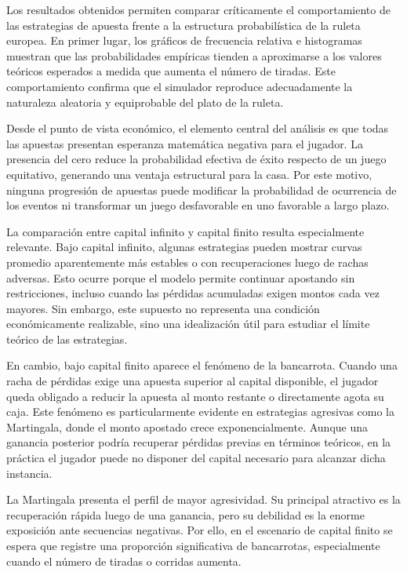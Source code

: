 \documentclass{article}
\begin{document}
Los resultados obtenidos permiten comparar críticamente el comportamiento de las estrategias de apuesta frente a la estructura probabilística de la ruleta europea. En primer lugar, los gráficos de frecuencia relativa e histogramas muestran que las probabilidades empíricas tienden a aproximarse a los valores teóricos esperados a medida que aumenta el número de tiradas. Este comportamiento confirma que el simulador reproduce adecuadamente la naturaleza aleatoria y equiprobable del plato de la ruleta.

Desde el punto de vista económico, el elemento central del análisis es que todas las apuestas presentan esperanza matemática negativa para el jugador. La presencia del cero reduce la probabilidad efectiva de éxito respecto de un juego equitativo, generando una ventaja estructural para la casa. Por este motivo, ninguna progresión de apuestas puede modificar la probabilidad de ocurrencia de los eventos ni transformar un juego desfavorable en uno favorable a largo plazo.

La comparación entre capital infinito y capital finito resulta especialmente relevante. Bajo capital infinito, algunas estrategias pueden mostrar curvas promedio aparentemente más estables o con recuperaciones luego de rachas adversas. Esto ocurre porque el modelo permite continuar apostando sin restricciones, incluso cuando las pérdidas acumuladas exigen montos cada vez mayores. Sin embargo, este supuesto no representa una condición económicamente realizable, sino una idealización útil para estudiar el límite teórico de las estrategias.

En cambio, bajo capital finito aparece el fenómeno de la bancarrota. Cuando una racha de pérdidas exige una apuesta superior al capital disponible, el jugador queda obligado a reducir la apuesta al monto restante o directamente agota su caja. Este fenómeno es particularmente evidente en estrategias agresivas como la Martingala, donde el monto apostado crece exponencialmente. Aunque una ganancia posterior podría recuperar pérdidas previas en términos teóricos, en la práctica el jugador puede no disponer del capital necesario para alcanzar dicha instancia.

La Martingala presenta el perfil de mayor agresividad. Su principal atractivo es la recuperación rápida luego de una ganancia, pero su debilidad es la enorme exposición ante secuencias negativas. Por ello, en el escenario de capital finito se espera que registre una proporción significativa de bancarrotas, especialmente cuando el número de tiradas o corridas aumenta.
\end{document}
